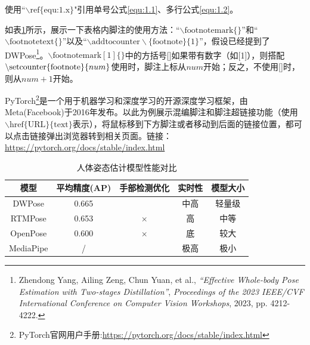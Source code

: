 \documentclass[a4paper,scheme=chinese,linespread=1.5]{ctexbook} %
\begin{document}
	使用“\textbf{$\backslash \text{ref\{equ:1.x\}}$}"引用单号公式\ref{equ:1.1}、多行公式\ref{equ:1.2}。
	
	\newpage
	
	如表\ref{tab:1.2}所示，展示一下表格内脚注的使用方法：“$\backslash \text{footnotemark}\{\}$”和“$\backslash \text{footnotetext\{\}}$”以及“$\backslash \text{addtocounter} \backslash \text{\{footnote\}\{1\}}$”，假设已经提到了DWPose\footnote{Zhendong Yang, Ailing Zeng, Chun Yuan, et al., \textit{``Effective Whole-body Pose Estimation with Two-stages Distillation''}, \textit{Proceedings of the 2023 IEEE/CVF International Conference on Computer Vision Workshops}, 2023, pp. 4212-4222.}。$\backslash \text{footnotemark} [ 1 ]\{\}$中的方括号[]如果带有数字（如[1]），则搭配$\backslash \text{setcounter\{footnote\}\{}\mathnormal{num}\text{\}}$使用时，脚注上标从$num$开始；反之，不使用[]时，则从$num+1$开始。
	
	PyTorch\footnote{PyTorch官网用户手册:\href{https://pytorch.org/docs/stable/index.html}{https://pytorch.org/docs/stable/index.html}}是一个用于机器学习和深度学习的开源深度学习框架，由Meta(Facebook)于2016年发布。以此为例展示混编脚注和脚注超链接功能（使用$\backslash \text{href\{URL\}\{text\}}$表示），将鼠标移到下方脚注\footnotemark[2]{}或者移动到后面的链接位置，都可以点击链接弹出浏览器转到相关页面。链接：\href{https://pytorch.org/docs/stable/index.html}{https://pytorch.org/docs/stable/index.html}
	
	
	\begin{table}[H]
		\centering
		\caption{人体姿态估计模型性能对比}
		\vspace*{-1em}
		\begin{tabular}{ccccc} %
			\toprule[1.5pt]
			模型   &  平均精度(AP) & 手部检测优化 & 实时性 & 模型大小 \\ \midrule[0.75pt]
			\setcounter{footnote}{1}
			DWPose\footnotemark[2]{}    & 0.665      & \checkmark                 & 中高       & 轻量级         \\
			\setcounter{footnote}{3}
			RTMPose\footnotemark[1]{}     & 0.653      & $\times$                & 高      &  中等          \\
			OpenPose\footnotemark{}    & 0.600        & $\times$                & 底       &  较大            \\ \cmidrule[0.5pt]{1-2}
			MediaPipe\footnotemark{}     & /      &  \checkmark                 & 极高       &  极小        \\
			\bottomrule[1.5pt]
		\end{tabular}
		\label{tab:1.2}
	\end{table}
	
\end{document}
